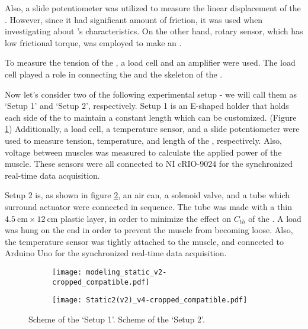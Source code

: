 Also, a slide potentiometer was utilized to measure the linear displacement of the \scpsnospace. However, since it had significant amount of friction, it was used when investigating about \scpnospace's characteristics. On the other hand, rotary sensor, which has low frictional torque, was employed to make an \antanospace. 

To measure the tension of the \scpsnospace, a load cell and an amplifier were used.
The load cell played a role in connecting the \scps and the skeleton of the \antanospace.



Now let's consider two of the following experimental setup - we will call them as `Setup 1' and `Setup 2', respectively. Setup 1 is 
%
an E-shaped holder that holds each side of the \scp to maintain a constant length which can be customized. (Figure \ref{static_sch}) Additionally, a load cell, a temperature sensor, and a slide potentiometer were used to measure tension, temperature, and length of the \scpnospace, respectively. Also, voltage between muscles was measured to calculate the applied power of the muscle. These sensors were all connected to NI cRIO-9024 for the synchronized real-time data acquisition.

Setup 2 is, 
%
as shown in figure \ref{dynamic_sch}, an air can, a solenoid valve, and a tube which surround actuator were connected in sequence. 
The tube was made with a thin $\SI{4.5}{\centi\meter} \times \SI{12}{\centi\meter}$ plastic layer, in order to minimize the effect on $C_{th}$ of the \scpnospace.
A load was hung on the end in order to prevent the muscle from becoming loose. 
Also, the temperature sensor was tightly attached to the muscle, and connected to Arduino Uno for the synchronized real-time data acquisition.


\begin{figure}[t]
	\centering
	\begin{subfigure}[t]{0.22\textwidth}
		\centering\texttt{[image: modeling\_static\_v2-cropped\_compatible.pdf]}
		\caption{\label{static_sch}}
	\end{subfigure}
	\begin{subfigure}[t]{0.22\textwidth}
		\centering\texttt{[image: Static2(v2)\_v4-cropped\_compatible.pdf]} %
		\caption{\label{dynamic_sch}}
	\end{subfigure}
	\caption[Scheme of two experimental setups]{ Scheme of the `Setup 1'.  Scheme of the `Setup 2'.}
	\label{exp_sch}
\end{figure}

